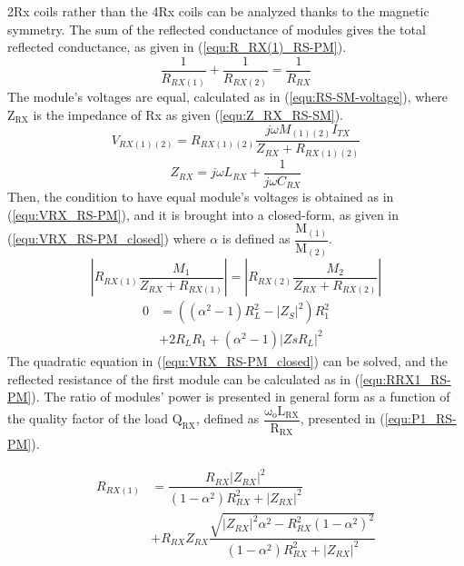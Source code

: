 \documentclass[journal]{IEEEtran}
\begin{document}
2Rx coils rather than the 4Rx coils can be analyzed thanks to the magnetic symmetry. The sum of the reflected conductance of modules gives the total reflected conductance, as given in  (\ref{equ:R_RX(1)_RS-PM}). 
\begin{equation}
    \label{equ:R_RX(1)_RS-PM}
    \dfrac{1}{R_{RX(1)}}+\dfrac{1}{R_{RX(2)}}=\dfrac{1}{R_{RX}}
\end{equation}
The module's voltages are equal, calculated as in (\ref{equ:RS-SM-voltage}), where $ \mathrm{Z_{RX}} $ is the impedance of Rx as given (\ref{equ:Z_RX_RS-SM}).
\begin{equation}
    \label{equ:RS-SM-voltage}
    V_{RX(1)(2)}=R_{RX(1)(2)}\dfrac{j\omega M_{(1)(2)} I_{TX}}{Z_{RX}+R_{RX(1)(2)}}
\end{equation}
\begin{equation}
    \label{equ:Z_RX_RS-SM}
    Z_{RX} =j\omega L_{RX} + \dfrac{1}{j\omega C_{RX}}
\end{equation}
Then, the condition to have equal module's voltages is obtained as in  (\ref{equ:VRX_RS-PM}), and it is brought into a closed-form, as given in (\ref{equ:VRX_RS-PM_closed}) where $\alpha$ is  defined as $\mathrm{\dfrac{M_{(1)}}{M_{(2)}}}$. 
\begin{equation}
    \label{equ:VRX_RS-PM}
  |R_{RX(1)}\dfrac{ M_1}{Z_{RX}+R_{RX(1)}}|= |R_{RX(2)}\dfrac{ M_2 }{Z_{RX}+R_{RX(2)}}|
\end{equation}
\begin{equation}
\label{equ:VRX_RS-PM_closed}
\begin{split}
0 &= ((\alpha^2-1)R_L^2-|Z_S|^2)R_1^2 \\
  &+2R_LR_1 +(\alpha^2-1)|ZsR_L|^2
\end{split}
\end{equation}
The quadratic equation in  (\ref{equ:VRX_RS-PM_closed}) can be solved, and the reflected resistance of the first module can be calculated as in (\ref{equ:RRX1_RS-PM}). The ratio of modules' power is presented in general form as a function of the quality factor of the load $\mathrm{Q_{RX}}$, defined as $\mathrm{\dfrac{\omega_o L_{RX}}{R_{RX}}}$, presented in  (\ref{equ:P1_RS-PM}). 

\begin{equation}
\label{equ:RRX1_RS-PM}
 \begin{split}
 R_{RX(1)} &=\dfrac{R_{RX}|Z_{RX}|^2}{(1-\alpha^2)R_{RX}^2+|Z_{RX}|^2}   \\
&+R_{RX}Z_{RX}\dfrac{\sqrt{|Z_{RX}|^2\alpha^2-R_{RX}^2(1-\alpha^2)^2}}{(1-\alpha^2)R_{RX}^2+|Z_{RX}|^2} 
\end{split}
\end{equation}
\end{document}

